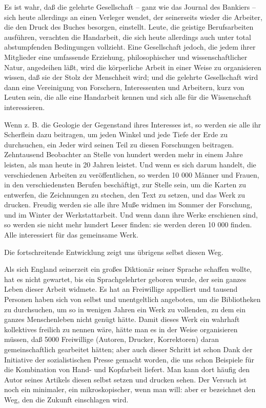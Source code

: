 \documentclass{scrbook}
\begin{document}
Es ist wahr, daß die gelehrte Gesellschaft – ganz wie das Journal des Bankiers – sich heute allerdings an einen Verleger wendet, der seinerseits wieder die Arbeiter, die den Druck des Buches besorgen, einstellt. Leute, die geistige Berufsarbeiten ausführen, verachten die Handarbeit, die sich heute allerdings auch unter total abstumpfenden Bedingungen vollzieht. Eine Gesellschaft jedoch, die jedem ihrer Mitglieder eine umfassende Erziehung, philosophischer und wissenschaftlicher Natur, angedeihen läßt, wird die körperliche Arbeit in einer Weise zu organisieren wissen, daß sie der Stolz der Menschheit wird; und die gelehrte Gesellschaft wird dann eine Vereinigung von Forschern, Interessenten und Arbeitern, kurz von Leuten sein, die alle eine Handarbeit kennen und sich alle für die Wissenschaft interessieren.

Wenn z. B. die Geologie der Gegenstand ihres Interesses ist, so werden sie alle ihr Scherflein dazu beitragen, um jeden Winkel und jede Tiefe der Erde zu durchsuchen, ein Jeder wird seinen Teil zu diesen Forschungen beitragen. Zehntausend Beobachter an Stelle von hundert werden mehr in einem Jahre leisten, als man heute in 20 Jahren leistet. Und wenn es sich darum handelt, die verschiedenen Arbeiten zu veröffentlichen, so werden 10 000 Männer und Frauen, in den verschiedensten Berufen beschäftigt, zur Stelle sein, um die Karten zu entwerfen, die Zeichnungen zu stechen, den Text zu setzen, und das Werk zu drucken. Freudig werden sie alle ihre Muße widmen im Sommer der Forschung, und im Winter der Werkstattarbeit. Und wenn dann ihre Werke erschienen sind, so werden sie nicht mehr hundert Leser finden: sie werden deren 10 000 finden. Alle interessiert für das gemeinsame Werk.

Die fortschreitende Entwicklung zeigt uns übrigens selbst diesen Weg.

Als sich England seinerzeit ein großes Diktionär seiner Sprache schaffen wollte, hat es nicht gewartet, bis ein Sprachgelehrter geboren wurde, der sein ganzes Leben dieser Arbeit widmete. Es hat an Freiwillige appelliert und tausend Personen haben sich von selbst und unentgeltlich angeboten, um die Bibliotheken zu durchsuchen, um so in wenigen Jahren ein Werk zu vollenden, zu dem ein ganzes Menschenleben nicht genügt hätte. Damit dieses Werk ein wahrhaft kollektives freilich zu nennen wäre, hätte man es in der Weise organisieren müssen, daß 5000 Freiwillige (Autoren, Drucker, Korrektoren) daran gemeinschaftlich gearbeitet hätten; aber auch dieser Schritt ist schon Dank der Initiative der sozialistischen Presse gemacht worden, die uns schon Beispiele für die Kombination von Hand- und Kopfarbeit liefert. Man kann dort häufig den Autor seines Artikels diesen selbst setzen und drucken sehen. Der Versuch ist noch ein minimaler, ein mikroskopischer, wenn man will: aber er bezeichnet den Weg, den die Zukunft einschlagen wird.
\end{document}
